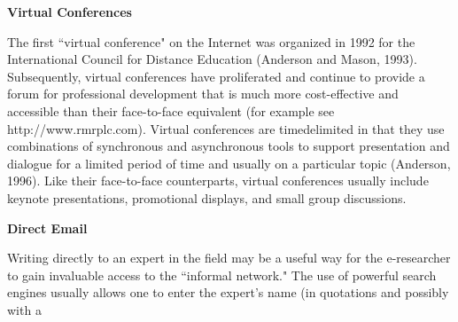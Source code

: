 \documentclass[8pt]{beamer}
\begin{document}
\begin{frame}
\vspace{3mm}
\hspace{-1cm}
\textbf{Virtual Conferences}
\vspace{3mm}

The first “virtual conference" on the Internet was organized in 1992 for the International Council for Distance Education (Anderson and Mason, 1993). Subsequently, virtual conferences have proliferated and continue to provide a forum for professional development that is much more cost-effective and accessible than their face-to-face
equivalent (for example see http://www.rmrplc.com). Virtual conferences are timedelimited in that they use combinations of synchronous and asynchronous tools to support presentation and dialogue for a limited period of time and usually on a particular topic (Anderson, 1996). Like their face-to-face counterparts, virtual conferences usually include keynote presentations, promotional displays, and small group discussions.

\vspace{3mm}
\hspace{-1cm}
\textbf{Direct Email}
\vspace{3mm}

Writing directly to an expert in the field may be a useful way for the e-researcher to gain invaluable access to the “informal network." The use of powerful search engines usually allows one to enter the expert's name (in quotations and possibly with a
\end{frame}
\end{document}
